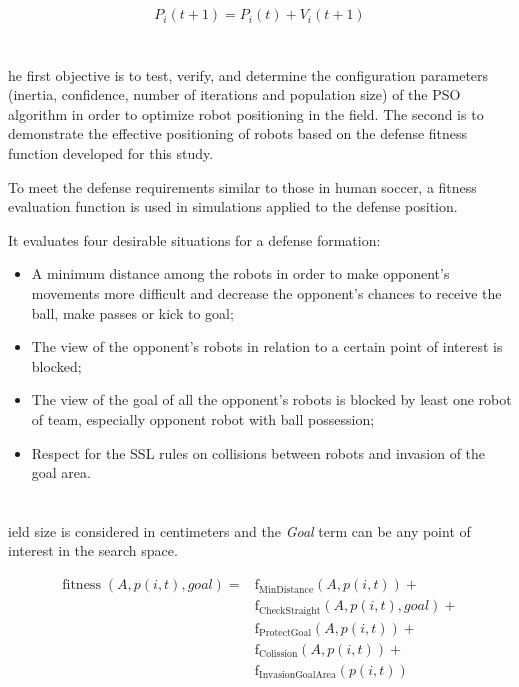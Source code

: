 \documentclass[a0,portrait]{sciposter}
\newcommand{\tituloA}[1]{\emph{\textbf{\color{white}{#1}}}}
\newcommand{\tituloB}[1]{\emph{\textbf{\color{blue}{#1}}}}
\begin{document}
\begin{multicols}{3}
\subsection*{\tituloB{PSO Position equation}}
    \[
    \begin{aligned}
    P_i(t+1)=P_i(t) +V_i(t+1)
    \end{aligned}
    \]

\section*{\tituloA{Proposal}}
    he first objective is to test, verify, and determine the configuration parameters (inertia, confidence, number of iterations and population size) of the PSO algorithm in order to optimize robot positioning in the field. The second is to demonstrate the effective positioning of robots based on the defense fitness function developed for this study.


    To meet the defense requirements similar to those in human soccer, a fitness evaluation function is used in simulations applied to the defense position. 

    It evaluates four desirable situations for a defense formation:
    \begin{itemize}
        \item A minimum distance among the robots in order to make opponent's movements more difficult and decrease the opponent's chances to receive the ball, make passes or kick to goal; 
        \item The view of the opponent's robots in relation to a certain point of interest is blocked;
        \item The view of the goal of all the opponent's robots is blocked by least one robot of team, especially opponent robot with ball possession;  
        \item Respect for the SSL rules on collisions between robots and invasion of the goal area. 
    \end{itemize}



\section*{\tituloA{General Equation}}
    ield size is considered in centimeters and the \emph{Goal} term can be any point of interest in the search space.

    \[
    \begin{aligned}
    \operatorname{fitness}(A, p(i,t),goal) =  
    & \operatorname{f_{MinDistance}}(A, p(i,t)) + \\
    & \operatorname{f_{CheckStraight}} (A, p(i,t), goal) + \\
    & \operatorname{f_{ProtectGoal}}(A, p(i,t)) + \\
    & \operatorname{f_{Colission}}(A, p(i,t)) + \\
    & \operatorname{f_{InvasionGoalArea}}(p(i,t))
    \end{aligned}
    \
    \]


\end{multicols}
\end{document}
